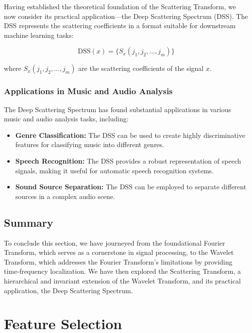 Having established the theoretical foundation of the Scattering Transform, we now consider its practical application---the Deep Scattering Spectrum (DSS). The DSS represents the scattering coefficients in a format suitable for downstream machine learning tasks:

\begin{equation}
  \text{DSS}(x) = \{S_x(j_1, j_2, \ldots, j_m)\}
  \label{eq:dss}
\end{equation}

where $S_x(j_1, j_2, \ldots, j_m)$ are the scattering coefficients of the signal $x$.

\subsubsection{Applications in Music and Audio Analysis}

The Deep Scattering Spectrum has found substantial applications in various music and audio analysis tasks, including:
\begin{itemize}
  \item \textbf{Genre Classification:} The DSS can be used to create highly discriminative features for classifying music into different genres.
  \item \textbf{Speech Recognition:} The DSS provides a robust representation of speech signals, making it useful for automatic speech recognition systems.
  \item \textbf{Sound Source Separation:} The DSS can be employed to separate different sources in a complex audio scene.
\end{itemize}

\subsection{Summary}

To conclude this section, we have journeyed from the foundational Fourier Transform, which serves as a cornerstone in signal processing, to the Wavelet Transform, which addresses the Fourier Transform's limitations by providing time-frequency localization. We have then explored the Scattering Transform, a hierarchical and invariant extension of the Wavelet Transform, and its practical application, the Deep Scattering Spectrum.


\section{Feature Selection}
\label{sec:feature-selection}


